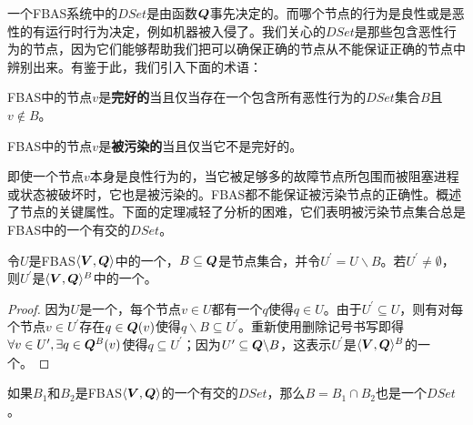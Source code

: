 一个FBAS系统中的$DSet$是由{\quorum}函数${\bm Q}$事先决定的。而哪个节点的行为是良性或是恶性的有运行时行为决定，例如机器被入侵了。我们关心的$DSet$是那些包含恶性行为的节点，因为它们能够帮助我们把可以确保正确的节点从不能保证正确的节点中辨别出来。有鉴于此，我们引入下面的术语：

\begin{definition}[完好的]
	FBAS中的节点$v$是\textbf{完好的}当且仅当存在一个包含所有恶性行为的$DSet$集合$B$且$v\not\in B$。
\end{definition}

\begin{definition}[被污染的]
	FBAS中的节点$v$是\textbf{被污染的}当且仅当它不是完好的。
\end{definition}

即使一个节点$v$本身是良性行为的，当它被足够多的故障节点所包围而被阻塞进程或状态被破坏时，它也是被污染的。FBAS都不能保证被污染节点的正确性。概述了节点的关键属性。下面的定理减轻了分析的困难，它们表明被污染节点集合总是FBAS中的一个有{\quorum}交的$DSet$。

\begin{theorem}\label{th1}
	令$U$是FBAS$\langle{\bm V},{\bm Q}\rangle$中的一个{\quorum}，$B\subseteq {\bm Q}$是节点集合，并令$U^\prime=U\backslash B$。若$U^\prime\neq \emptyset$，则$U^\prime$是$\langle{\bm V},{\bm Q}\rangle^B$中的一个{\quorum}。
\end{theorem}

\begin{proof}
	因为$U$是一个{\quorum}，每个节点$v\in U$都有一个$q$使得$q\in U$。由于$U^\prime\subseteq U$，则有对每个节点$v\in U^\prime$存在$q\in{\bm Q}(v)$使得$q\backslash B\subseteq U^\prime$。重新使用删除记号书写即得$\forall v\in U^\prime,\exists q\in{\bm Q}^B(v)$使得$q\subseteq U^\prime$；因为$U^\prime \subseteq {\bm Q}\backslash B$，这表示$U^\prime$是$\langle{\bm V},{\bm Q}\rangle^B$的一个{\quorum}。
\end{proof}

\begin{theorem}\label{th2}
	如果$B_1$和$B_2$是FBAS$\langle{\bm V},{\bm Q}\rangle$的一个有{\quorum}交的$DSet$，那么$B=B_1\cap B_2$也是一个$DSet$。
\end{theorem}


